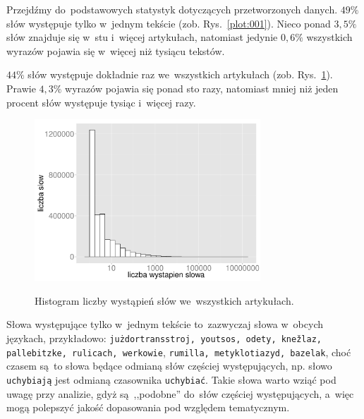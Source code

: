 \documentclass{praca1}
\begin{document}
Przejdźmy do~podstawowych statystyk dotyczących przetworzonych danych. $49\%$ słów występuje tylko w~jednym tekście (zob. Rys.~\ref{plot:001}). Nieco ponad $3,5\%$ słów znajduje się w~stu i~więcej artykułach, natomiast jedynie $0,6\%$ wszystkich wyrazów pojawia się w~więcej niż tysiącu tekstów.

$44\%$ słów występuje dokładnie raz we~wszystkich artykułach (zob. Rys.~\ref{plot:002}). Prawie $4,3\%$ wyrazów pojawia się ponad sto razy, natomiast mniej niż jeden procent słów występuje tysiąc i~więcej razy.


\begin{figure}[!h]
  \centering
  \includegraphics[width=240pt]{plot2.pdf}\\
  \caption{Histogram liczby wystąpień słów we~wszystkich artykułach.}\label{plot:002}
\end{figure}


Słowa występujące tylko w~jednym tekście to~zazwyczaj słowa w~obcych językach, przykładowo: \verb|jużdortransstroj, youtsos, odety, knežlaz, pallebitzke, rulicach, werkowie|, \verb|rumilla, metyklotiazyd, bazelak|,
choć czasem są~to słowa będące odmianą słów częściej występujących, np. słowo \verb|uchybiają| jest odmianą czasownika \verb|uchybiać|. Takie słowa warto wziąć pod uwagę przy analizie, gdyż są~,,podobne'' do~słów częściej występujących, a~więc mogą polepszyć jakość dopasowania pod względem tematycznym.
\end{document}
